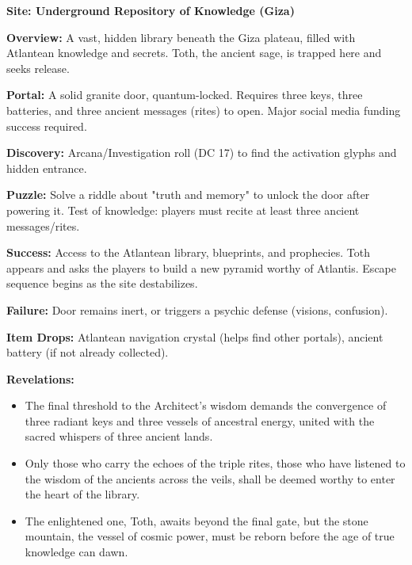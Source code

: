\documentclass[12pt]{article}
\begin{document}
\textbf{Site: Underground Repository of Knowledge (Giza)}

\textbf{Overview:}  
A vast, hidden library beneath the Giza plateau, filled with Atlantean knowledge and secrets. Toth, the ancient sage, is trapped here and seeks release.

\textbf{Portal:}  
A solid granite door, quantum-locked. Requires three keys, three batteries, and three ancient messages (rites) to open. Major social media funding success required.

\textbf{Discovery:}  
Arcana/Investigation roll (DC 17) to find the activation glyphs and hidden entrance.

\textbf{Puzzle:}  
Solve a riddle about "truth and memory" to unlock the door after powering it. Test of knowledge: players must recite at least three ancient messages/rites.

\textbf{Success:}  
Access to the Atlantean library, blueprints, and prophecies. Toth appears and asks the players to build a new pyramid worthy of Atlantis. Escape sequence begins as the site destabilizes.

\textbf{Failure:}  
Door remains inert, or triggers a psychic defense (visions, confusion).

\textbf{Item Drops:}  
Atlantean navigation crystal (helps find other portals), ancient battery (if not already collected).

\textbf{Revelations:}
\begin{itemize}
  \item The final threshold to the Architect's wisdom demands the convergence of three radiant keys and three vessels of ancestral energy, united with the sacred whispers of three ancient lands.
  \item Only those who carry the echoes of the triple rites, those who have listened to the wisdom of the ancients across the veils, shall be deemed worthy to enter the heart of the library.
  \item The enlightened one, Toth, awaits beyond the final gate, but the stone mountain, the vessel of cosmic power, must be reborn before the age of true knowledge can dawn.
\end{itemize}
\end{document}
